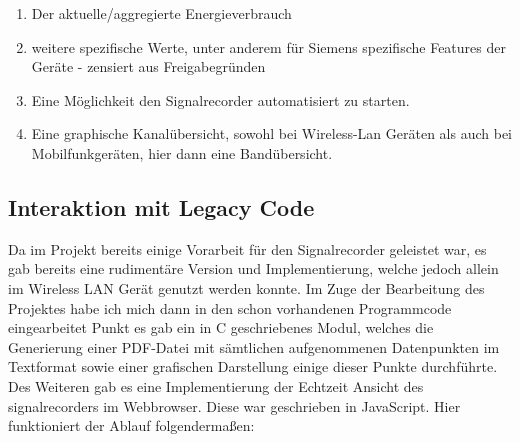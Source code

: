 \begin{enumerate}
\begin{enumerate}
                        \item Der aktuelle/aggregierte Energieverbrauch
                        \item weitere spezifische Werte, unter anderem für Siemens spezifische Features der Geräte - zensiert aus Freigabegründen
                        \item Eine Möglichkeit den Signalrecorder automatisiert zu starten.
                        \item Eine graphische Kanalübersicht, sowohl bei Wireless-Lan Geräten als auch bei Mobilfunkgeräten, hier dann eine Bandübersicht.
                \end{enumerate}
\end{enumerate}
\subsection{Interaktion mit Legacy Code}
Da im Projekt bereits einige Vorarbeit für den Signalrecorder geleistet war, es gab bereits eine rudimentäre Version und Implementierung, welche jedoch allein im Wireless LAN Gerät genutzt werden konnte.  Im Zuge der Bearbeitung des Projektes  habe ich mich dann in den schon vorhandenen Programmcode eingearbeitet Punkt es gab ein in C geschriebenes Modul,  welches die Generierung einer PDF-Datei mit sämtlichen aufgenommenen Datenpunkten im Textformat sowie einer grafischen Darstellung einige dieser Punkte durchführte. \\
 Des Weiteren gab es eine Implementierung der Echtzeit Ansicht des signalrecorders im Webbrowser. Diese war geschrieben in JavaScript.  Hier funktioniert der Ablauf  folgendermaßen:
